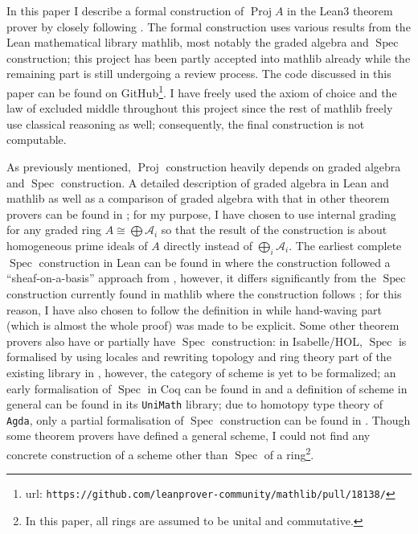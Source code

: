 \documentclass[a4paper,UKenglish,cleveref, autoref, thm-restate]{lipics-v2021}
\begin{document}
In this paper I describe a formal construction of $\operatorname{Proj} A$ in the Lean3 theorem prover \cite{de2015lean} by closely following \cite[Chapter~II]{hartshorne1977graduate}. The formal construction uses various results from the Lean mathematical library \textsf{mathlib}, most notably the graded algebra and $\operatorname{Spec}$ construction; this project has been partly accepted into \textsf{mathlib} already while the remaining part is still undergoing a review process. The code discussed in this paper can be found on GitHub\footnote{url: \texttt{https://github.com/leanprover-community/mathlib/pull/18138/}}.  I have freely used the axiom of choice and the law of excluded middle throughout this project since the rest of \textsf{mathlib} freely use classical reasoning as well; consequently, the final construction is not computable.

As previously mentioned, $\operatorname{Proj}$ construction heavily depends on graded algebra and $\operatorname{Spec}$ construction. A detailed description of graded algebra in Lean and \textsf{mathlib} as well as a comparison of graded algebra with that in other theorem provers can be found in \cite{wieser2022graded}; for my purpose, I have chosen to use internal grading for any graded ring $A \cong \bigoplus \mathcal{A}_i$ so that the result of the construction is about homogeneous prime ideals of $A$ directly instead of $\bigoplus_i \mathcal{A}_i$. The earliest complete $\operatorname{Spec}$ construction in Lean can be found in \cite{buzzard2022schemes} where the construction followed a ``sheaf-on-a-basis'' approach from \cite[\href{https://stacks.math.columbia.edu/tag/01HR}{Section 01HR}]{stacks-project}, however, it differs significantly from the $\operatorname{Spec}$ construction currently found in \textsf{mathlib} where the construction follows \cite[Chapter~II]{hartshorne1977graduate}; for this reason, I have also chosen to follow the definition in \cite[Chapter~II]{hartshorne1977graduate} while hand-waving part (which is almost the whole proof) was made to be explicit. Some other theorem provers also have or partially have $\operatorname{Spec}$ construction: in Isabelle/HOL, $\operatorname{Spec}$ is formalised by using locales and rewriting topology and ring theory part of the existing library in \cite{doi:10.1080/10586458.2022.2062073}, however, the category of scheme is yet to be formalized; an early formalisation of $\operatorname{Spec}$ in Coq can be found in \cite{chicli2001formalisation} and a definition of scheme in general can be found in its \texttt{UniMath} library; due to homotopy type theory of \texttt{Agda}, only a partial formalisation of $\operatorname{Spec}$ construction can be found in \cite{mortbergtowards}. Though some theorem provers have defined a general scheme, I could not find any concrete construction of a scheme other than $\operatorname{Spec}$ of a ring\footnote{In this paper, all rings are assumed to be unital and commutative.}.
\end{document}
